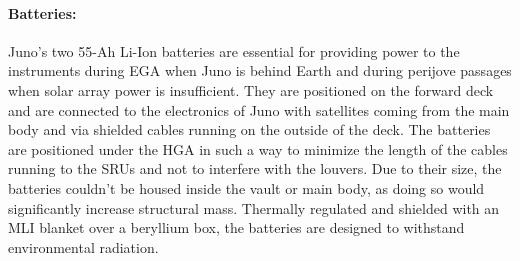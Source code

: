 \paragraph{Batteries:} Juno's two 55-Ah\cite{batteries_info} Li-Ion batteries are essential for providing power to the instruments during EGA when Juno is behind Earth and during perijove passages when solar array power is insufficient.\cite{batterie} They are positioned on the forward deck and are connected to the electronics of Juno with satellites coming from the main body and via shielded cables running on the outside of the deck. The batteries are positioned under the HGA in such a way to minimize the length of the cables running to the SRUs and not to interfere with the louvers.\cite{batteries_position} Due to their size, the batteries couldn't be housed inside the vault or main body, as doing so would significantly increase structural mass. Thermally regulated and shielded with an MLI blanket over a beryllium box, the batteries are designed to withstand environmental radiation\cite{batteries_position}. 

